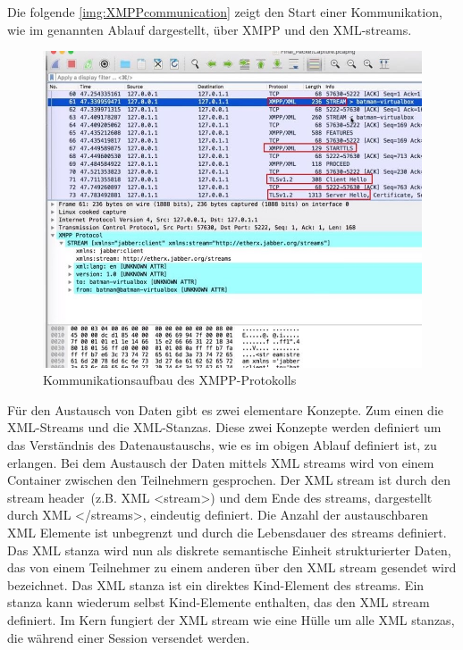 \documentclass[a4paper,titlepage,halfparskip,12pt]{scrreprt}
\begin{document}
\begin{onehalfspacing}
\pagebreak

Die folgende \autoref{img:XMPPcommunication} zeigt den Start einer Kommunikation, wie im genannten Ablauf dargestellt, über \ac{XMPP} und den \ac{XML}-streams.

\begin{figure}[h]
	\centering
	\includegraphics[width=\textwidth]{images/XML_Wireshark}
	\caption{Kommunikationsaufbau des \ac{XMPP}-Protokolls}
	\label{img:XMPPcommunication}
\end{figure} 

Für den Austausch von Daten gibt es zwei elementare Konzepte. Zum einen die \ac{XML}-Streams und die \ac{XML}-Stanzas. Diese zwei Konzepte werden definiert um das Verständnis des Datenaustauschs, wie es im obigen Ablauf definiert ist, zu erlangen. Bei dem Austausch der Daten mittels \ac{XML} streams wird von einem Container zwischen den Teilnehmern gesprochen. Der \ac{XML} stream ist durch den \glqq stream header\grqq\ (z.B. \ac{XML} <stream>) und dem Ende des streams, dargestellt durch \ac{XML} </streams>, eindeutig definiert. Die Anzahl der austauschbaren \ac{XML} Elemente ist unbegrenzt und durch die Lebensdauer des streams definiert. Das \ac{XML} stanza wird nun als diskrete semantische Einheit strukturierter Daten, das von einem Teilnehmer zu einem anderen über den \ac{XML} stream gesendet wird bezeichnet. Das \ac{XML} stanza ist ein direktes Kind-Element des streams. Ein stanza kann wiederum selbst Kind-Elemente enthalten, das den \ac{XML} stream definiert. Im Kern fungiert der \ac{XML} stream wie eine Hülle um alle \ac{XML} stanzas, die während einer Session versendet werden.


\end{onehalfspacing}
\end{document}

